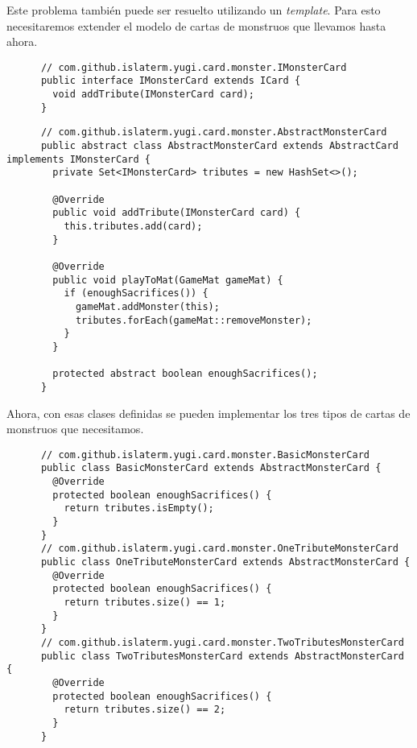   \begin{Answer}[ref={ex:template-2}]
    Este problema también puede ser resuelto utilizando un \textit{template}.
    Para esto necesitaremos extender el modelo de cartas de monstruos que llevamos hasta 
    ahora.
    \begin{verbatim}
      // com.github.islaterm.yugi.card.monster.IMonsterCard
      public interface IMonsterCard extends ICard {
        void addTribute(IMonsterCard card);
      }
    \end{verbatim}

    \begin{verbatim}
      // com.github.islaterm.yugi.card.monster.AbstractMonsterCard
      public abstract class AbstractMonsterCard extends AbstractCard implements IMonsterCard {
        private Set<IMonsterCard> tributes = new HashSet<>();

        @Override
        public void addTribute(IMonsterCard card) {
          this.tributes.add(card);
        }
      
        @Override
        public void playToMat(GameMat gameMat) {
          if (enoughSacrifices()) {
            gameMat.addMonster(this);
            tributes.forEach(gameMat::removeMonster);
          }
        }

        protected abstract boolean enoughSacrifices();
      }
    \end{verbatim}

    Ahora, con esas clases definidas se pueden implementar los tres tipos de cartas de 
    monstruos que necesitamos.
    \begin{verbatim}
      // com.github.islaterm.yugi.card.monster.BasicMonsterCard
      public class BasicMonsterCard extends AbstractMonsterCard {
        @Override
        protected boolean enoughSacrifices() {
          return tributes.isEmpty();
        }
      }
      // com.github.islaterm.yugi.card.monster.OneTributeMonsterCard
      public class OneTributeMonsterCard extends AbstractMonsterCard {
        @Override
        protected boolean enoughSacrifices() {
          return tributes.size() == 1;
        }
      }
      // com.github.islaterm.yugi.card.monster.TwoTributesMonsterCard
      public class TwoTributesMonsterCard extends AbstractMonsterCard {
        @Override
        protected boolean enoughSacrifices() {
          return tributes.size() == 2;
        }
      }
    \end{verbatim}
  \end{Answer}